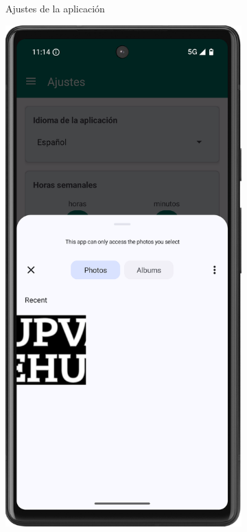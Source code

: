 \begin{figure}[H]
\begin{subfigure}[b]{0.3\textwidth}
         \caption{Ajustes de la aplicación}
         \label{fig:settings-1}
     \end{subfigure}
     \hfill
     \begin{subfigure}[b]{0.3\textwidth}
         \centering
         \includegraphics[width=\textwidth]{root/settings-2.png}

\end{subfigure}
\end{figure}
